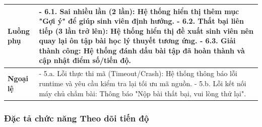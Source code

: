 \documentclass[../main.tex]{subfiles}
\begin{document}
{\begin{tabularx}{\textwidth}{|p{3.5cm}|>{\raggedright\arraybackslash}X|}
\hline
\textbf{Luồng phụ} & - 6.1. Sai nhiều lần (2 lần): Hệ thống hiển thị thêm mục "Gợi ý" để giúp sinh viên định hướng. \newline - 6.2. Thất bại liên tiếp (3 lần trở lên): Hệ thống hiển thị đề xuất sinh viên nên quay lại ôn tập bài học lý thuyết tương ứng. \newline - 6.3. Giải thành công: Hệ thống đánh dấu bài tập đã hoàn thành và cập nhật điểm số/tiến độ. \\
\hline
\textbf{Ngoại lệ} & - 5.a. Lỗi thực thi mã (Timeout/Crash): Hệ thống thông báo lỗi runtime và yêu cầu kiểm tra lại tối ưu mã nguồn. \newline - 5.b. Lỗi kết nối máy chủ chấm bài: Thông báo "Nộp bài thất bại, vui lòng thử lại". \\
\hline
\end{tabularx}
}

\subsubsection{Đặc tả chức năng Theo dõi tiến độ}
\end{document}
